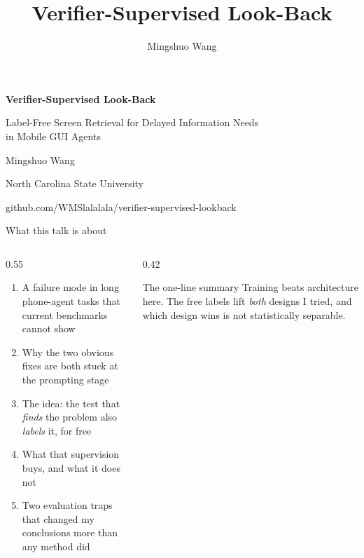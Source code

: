 \documentclass[aspectratio=169,10pt]{beamer}
\title{Verifier-Supervised Look-Back}
\author{Mingshuo Wang}
\date{}
\begin{document}
{
\begin{frame}[plain]
\vspace{1.0cm}
{\color{white}\LARGE\bfseries Verifier-Supervised Look-Back\par}
\vspace{0.3cm}
{\color{white}\large Label-Free Screen Retrieval for Delayed Information Needs\\in Mobile GUI Agents\par}
\vspace{0.9cm}
{\color{white}\normalsize Mingshuo Wang\par}
{\color{white!80!wolfred}\small North Carolina State University\par}
\vspace{0.4cm}
{\color{white!80!wolfred}\scriptsize github.com/WMSlalalala/verifier-supervised-lookback\par}
\end{frame}}

\begin{frame}{What this talk is about}
\vspace{0.3cm}
\begin{columns}[T]
\begin{column}{0.55\textwidth}
\begin{enumerate}\setlength\itemsep{0.45em}
\item A failure mode in long phone-agent tasks that current benchmarks cannot show
\item Why the two obvious fixes are both stuck at the prompting stage
\item \alert{The idea}: the test that \emph{finds} the problem also \emph{labels} it, for free
\item What that supervision buys, and what it does not
\item Two evaluation traps that changed my conclusions more than any method did
\end{enumerate}
\end{column}
\begin{column}{0.42\textwidth}
\vspace{0.3cm}
\begin{block}{The one-line summary}
Training beats architecture here. The free labels lift \emph{both} designs I tried, and which design wins is not statistically separable.
\end{block}
\end{column}
\end{columns}
\end{frame}
\end{document}
